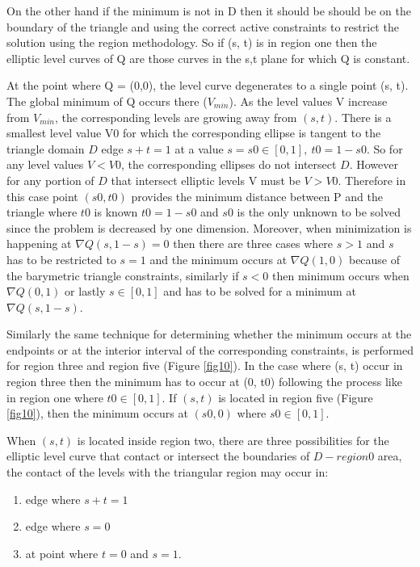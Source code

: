 On the other hand if the minimum is not in D then it should be should be on the boundary of the triangle and using the correct active constraints to restrict the solution using the region methodology. So if (s, t) is in region one then the elliptic level curves of Q are those curves in the s,t plane for which Q is constant. 

At the point where Q = (0,0), the level curve degenerates to a single point (s, t). The global minimum of Q occurs there ($V_{min}$). As the level values V increase from $V_{min}$, the corresponding levels are growing away from $(s,t)$. There is a smallest level value V0 for which the corresponding ellipse is tangent to the triangle domain $D$ edge $s+t = 1$ at a value $s = s0 \in [0,1], \: t0 = 1 - s0$. So for any level values $V < V0$, the corresponding ellipses do not intersect $D$. However for any portion of $D$ that intersect elliptic levels V must be $V > V0$. Therefore in this case point $(s0, t0)$ provides the minimum distance between P and the triangle where $t0$ is known $t0 = 1 - s0$ and $s0$ is the only unknown to be solved since the problem is decreased by one dimension. Moreover, when minimization is happening at $\nabla Q(s, 1 − s) = 0$ then there are three cases where $s > 1$ and $s$ has to be restricted to $s=1$ and the minimum occurs at $\nabla Q(1, 0)$ because of the barymetric triangle constraints, similarly if $s < 0$ then minimum occurs when $\nabla Q(0,1)$ or lastly $s \in [0,1]$ and has to be solved for a minimum at $\nabla Q(s,1-s)$.

Similarly the same technique for determining whether the minimum occurs at the endpoints or at the interior interval of the corresponding constraints, is performed for region three and region five (Figure \ref{fig10}). In the case where (s, t) occur in region three then the minimum has to occur at (0, t0) following the process like in region one where $t0 \in [0, 1]$. If $(s, t)$ is located in region five (Figure \ref{fig10}), then the minimum occurs at $(s0, 0)$ where $s0 \in [0, 1]$.  

When $(s, t)$ is located inside region two, there are three possibilities for the elliptic level curve that contact or intersect the boundaries of $D - region0$ area, the contact of the levels with the triangular region may occur in: 
\begin{enumerate}
\item edge where $s + t = 1$ 
\item edge where $s = 0$
\item at point where $t = 0$ and $s = 1$.
\end{enumerate}

